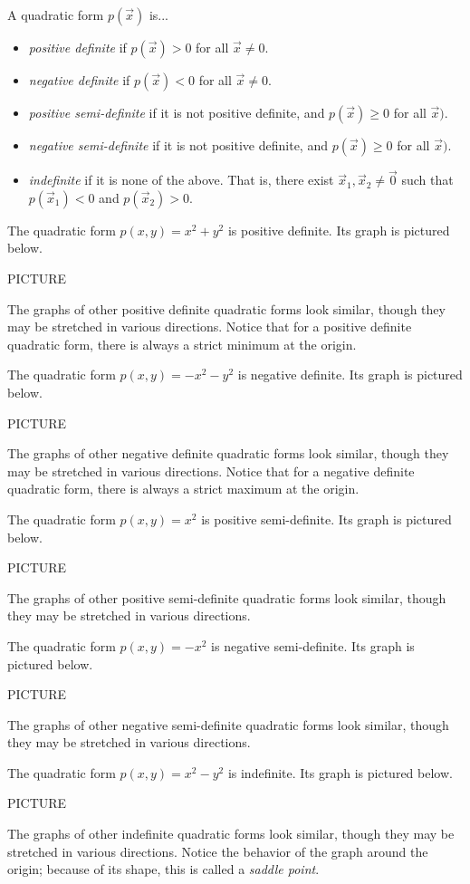 \documentclass{ximera}
\begin{document}
\begin{definition}
A quadratic form $p(\vec{x})$ is...
\begin{itemize}
\item \emph{positive definite} if $p(\vec{x})>0$ for all $\vec{x}\neq 0$.

\item \emph{negative definite} if $p(\vec{x})<0$ for all $\vec{x}\neq 0$.

\item \emph{positive semi-definite} if it is not positive definite, and $p(\vec{x})\geq 0$ for all $\vec{x})$.

\item \emph{negative semi-definite} if it is not positive definite, and $p(\vec{x})\geq 0$ for all $\vec{x})$.

\item \emph{indefinite} if it is none of the above. That is, there exist $\vec{x}_1,\vec{x}_2\neq \vec{0}$ such that $p(\vec{x}_1) <0$ and $p(\vec{x}_2)>0$. 
\end{itemize}
\end{definition}

\begin{example}
The quadratic form $p(x,y) = x^2+y^2$ is positive definite. Its graph is pictured below.

PICTURE

The graphs of other positive definite quadratic forms look similar, though they may be stretched in various directions. Notice that for a positive definite quadratic form, there is always a strict minimum at the origin.

The quadratic form $p(x,y) = -x^2-y^2$ is negative definite. Its graph is pictured below.

PICTURE

The graphs of other negative definite quadratic forms look similar, though they may be stretched in various directions. Notice that for a negative definite quadratic form, there is always a strict maximum at the origin.

The quadratic form $p(x,y) = x^2$ is positive semi-definite. Its graph is pictured below.

PICTURE

The graphs of other positive semi-definite quadratic forms look similar, though they may be stretched in various directions. 

The quadratic form $p(x,y) = -x^2$ is negative semi-definite. Its graph is pictured below.

PICTURE

The graphs of other negative semi-definite quadratic forms look similar, though they may be stretched in various directions.

The quadratic form $p(x,y) = x^2-y^2$ is indefinite. Its graph is pictured below.

PICTURE

The graphs of other indefinite quadratic forms look similar, though they may be stretched in various directions. Notice the behavior of the graph around the origin; because of its shape, this is called a \emph{saddle point}.

\end{example}
\end{document}
